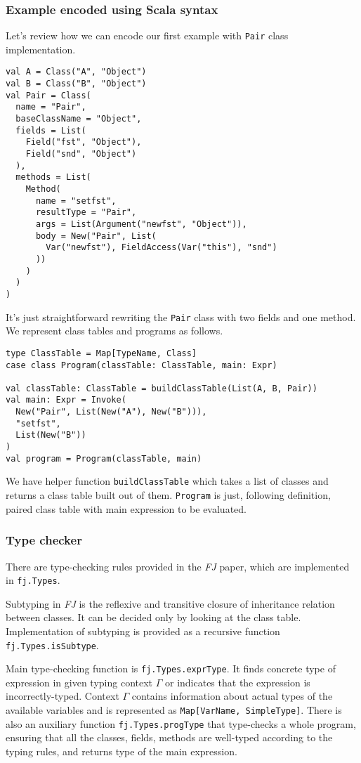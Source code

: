 \documentclass{article}[12pt]
\begin{document}
\subsubsection{Example encoded using Scala syntax}

Let's review how we can encode our first example with
\texttt{Pair} class implementation.

\begin{verbatim}
val A = Class("A", "Object")
val B = Class("B", "Object")
val Pair = Class(
  name = "Pair",
  baseClassName = "Object",
  fields = List(
    Field("fst", "Object"),
    Field("snd", "Object")
  ),
  methods = List(
    Method(
      name = "setfst",
      resultType = "Pair",
      args = List(Argument("newfst", "Object")),
      body = New("Pair", List(
        Var("newfst"), FieldAccess(Var("this"), "snd")
      ))
    )
  )
)
\end{verbatim}
It's just straightforward rewriting the \texttt{Pair} class
with two fields and one method. We represent class tables and
programs as follows.

\begin{verbatim}
type ClassTable = Map[TypeName, Class]
case class Program(classTable: ClassTable, main: Expr)

val classTable: ClassTable = buildClassTable(List(A, B, Pair))
val main: Expr = Invoke(
  New("Pair", List(New("A"), New("B"))),
  "setfst",
  List(New("B"))
)
val program = Program(classTable, main)
\end{verbatim}
We have helper function \texttt{buildClassTable} which takes a list
of classes and returns a class table built out of them.
\texttt{Program} is just, following definition, paired class table
with main expression to be evaluated.

\subsubsection{Type checker}

There are type-checking rules provided in the \emph{FJ} paper,
which are implemented in \texttt{fj.Types}.

Subtyping in \emph{FJ} is the reflexive and transitive closure of
inheritance relation between classes. It can be decided only by
looking at the class table. Implementation of subtyping is provided
as a recursive function \texttt{fj.Types.isSubtype}.

Main type-checking function is \texttt{fj.Types.exprType}. It
finds concrete type of expression in given typing context $\Gamma$
or indicates that the expression is incorrectly-typed. Context
$\Gamma$ contains information about actual types of the available
variables and is represented as \texttt{Map[VarName, SimpleType]}.
There is also an auxiliary function \texttt{fj.Types.progType}
that type-checks a whole program, ensuring that all the classes, fields,
methods are well-typed according to the typing rules, and returns
type of the main expression.
\end{document}
